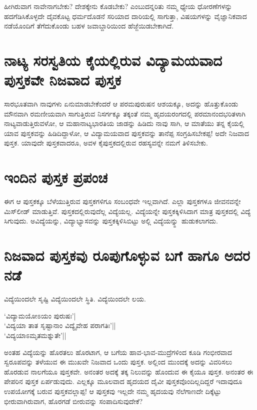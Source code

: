 ಹೀಗಿರುವಾಗ ನಾವೇನಾಗಬೇಕು? ದೇಶಕ್ಕೇನು ಕೊಡಬೇಕು? ಎಂಬುದನ್ನರಿತು ನಮ್ಮ ಧ್ಯೇಯ ಧೋರಣೆಗಳನ್ನು ಹದಗೆಡಿಸಿಕೊಳ್ಳದೇ ದೈವಕೊಟ್ಟ ಧರ್ಮದೊಡನೆ ಸರಿಯಾದ ದಾರಿಯಲ್ಲಿ ಸಾಗುತ್ತಾ, ವಿಷಯಗಳನ್ನು ವೈಜ್ಞಾನಿಕವಾದ ನಡೆಯೊಂದಿಗೆ ತೆಗೆದುಕೊಂಡು ಬಹಳ ಜವಾಬ್ದಾರಿಯಿಂದ ಹೆಜ್ಜೆಯಿಡಬೇಕಾಗಿದೆ.

\section*{ನಾಟ್ಯ ಸರಸ್ವತಿಯ ಕೈಯಲ್ಲಿರುವ ವಿದ್ಯಾಮಯವಾದ ಪುಸ್ತಕವೇ ನಿಜವಾದ ಪುಸ್ತಕ} 

ಸಾರಭೂತವಾಗಿ ನಾವುಗಳು ಏನುಮಾಡಬೇಕೆಂದರೆ ಆ ಪರಮಪುರುಷನ ಆಶಯಕ್ಕೂ, ಅದನ್ನು ಹೊತ್ತುಕೊಂಡು ಮೌನವಾಗಿ ರಮಣೀಯವಾಗಿ ಸಾಗುತ್ತಿರುವ ನಿಸರ್ಗಕ್ಕೂ ತಕ್ಕಂತೆ ನಮ್ಮ ಹೃದಯರಂಗದಲ್ಲಿ ಪರಮಾನಂದಭರಿತಳಾಗಿ ನಾಟ್ಯವಾಡುತ್ತಿರುವಳೋ, ಆ ಮಹಾನಾಟ್ಯಭಾರತಿಯ ಜಾಡನ್ನು ಹಿಡಿದು ನಾವು ಸಾಗಿ, ಆ ಮಾತೆಯು ತನ್ನ ಕೈಯಲ್ಲಿ ಯಾವ ಪುಸ್ತಕವನ್ನು ಹಿಡಿದಿದ್ದಾಳೋ, ಆ ವಿದ್ಯಾಮಯವಾದ ಪುಸ್ತಕವನ್ನು ತಾನೆಪ್ಪ ಸಂಗ್ರಹಿಸಬೇಕಪ್ಪ! ಅದೇ ನಿಜವಾದ ಪುಸ್ತಕ. ಯಾವುದೇ ಪುಸ್ತಕವಾದರೂ, ಅವಳ ಕೈಪುಸ್ತಕದಲ್ಲಿರುವ ರಹಸ್ಯವನ್ನೇ ನಮಗೆ ತಿಳಿಸಬೇಕು.

\section*{ಇಂದಿನ ಪುಸ್ತಕ ಪ್ರಪಂಚ}

ಈಗ ಆ ಪುಸ್ತಕಕ್ಕೂ ಬೆಳೆಯುತ್ತಿರುವ ಪುಸ್ತಕಗಳಿಗೂ ಸಂಬಂಧವೇ ಇಲ್ಲವಾಗಿದೆ. ಎಲ್ಲಾ ಪುಸ್ತಕಗಳೂ ಜೀವನವನ್ನೇ ಮಿಸ್‌ಲೀಡ್ ಮಾಡುತ್ತಿವೆ. ಪುಸ್ತಕದಲ್ಲಿರುವುದೆಲ್ಲ ವಿದ್ಯೆಯಲ್ಲ. ವಿದ್ಯೆಯನ್ನೇ ಪುಸ್ತಕಕ್ಕಿಳಿಸಿದಾಗ ಮಾತ್ರ ಪುಸ್ತಕದಲ್ಲಿ ವಿದ್ಯೆ ಸಿಗುವುದು. ಅವಿದ್ಯೆಯನ್ನು, ವಿದ್ಯಾಭ್ಯಾಸವನ್ನು ಪುಸ್ತಕಕ್ಕಿಳಿಸಿಬಿಟ್ಟು ಅಲ್ಲಿ ವಿದ್ಯೆಯನ್ನ್ಹು ಹುಡುಕಲಾಗದು.

\section*{ನಿಜವಾದ ಪುಸ್ತಕವು ರೂಪುಗೊಳ್ಳುವ ಬಗೆ ಹಾಗೂ ಅದರ ನಡೆ}

ವಿದ್ಯೆಯಿಂದಲೇ ಸೃಷ್ಟಿ ವಿದ್ಯೆಯಿಂದಲೇ ಸ್ಥಿತಿ. ವಿದ್ಯೆಯಿಂದಲೇ ಲಯ.

\begin{shloka}
`ವಿದ್ಯಾಮಯೋಽಯಂ ಪುರುಷಃ'|\\
`ವಿದ್ಯಯಾ ತಾತ ಸೃಷ್ಟಾನಾಂ ವಿದ್ಯೈವೇಹ ಪರಾಗತಿಃ'||\\
`ವಿದ್ಯಯಾಽಮೃತಮಶ್ನುತೇ'||
\end{shloka}
ಅಂತಹ ವಿದ್ಯೆಯನ್ನು ಹೊರತಲು ಹೊರಟಾಗ, ಆ ಬಗೆಯ ಹಾವ-ಭಾವ-ಮುದ್ರೆಗಳಿಂದ ಕೂಡಿ ಗಂಭೀರವಾದ ಸ್ವರೂಪವನ್ನು ತಳೆಯುವ ಈ ಮುಖವೇ ನಿಜವಾದ ಒಂದು ಪುಸ್ತಕ. ಅಲ್ಲಿಂದ ಮುಂದಕ್ಕೆ ಅದನ್ನು ವಿವರಿಸಲು ಹೊರಡುವ ನಾಲಗೆಯೂ ಪುಸ್ತಕವೇ. ಅನಂತರ ಅದಕ್ಕೆ ತಕ್ಕ ನಿಲುವನ್ನು ಹೊಂದುವ ಈ ಕೈಯೂ ಪುಸ್ತಕ. ಅನಂತರ ಈ ಪೇಪರಿನ ಪುಸ್ತಕ ಏರ್ಪಡುವುದು. ಎಲ್ಲಕ್ಕೂ ಮೂಲವಾದ ಹೃದಯದ ದೈವೀ ಪುಸ್ತಕವೊಂದಿಲ್ಲದಿದ್ದರೆ ಇದಾವುದೂ ಉಪಯೋಗಕ್ಕೆ ಬರುವ ಪುಸ್ತಕವಲ್ಲಾಪ್ಪ! ಆ ಪುಸ್ತಕವು ಇಲ್ಲದೇ ನಮ್ಮ ಹೃದಯವು ನೆಲೆಗಾಣದೇ ದಿಕ್ಕೆಟ್ಟು ಭೀರುವಾಗಿರುವಾಗ, ಹೊರಗಡೆ ಬೀರುವನ್ನು ಸಂಪಾದಿಸುವುದೇಕೆ?

